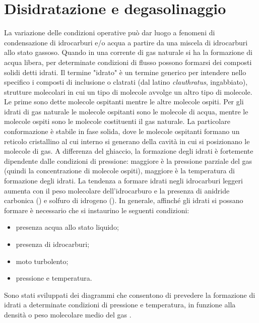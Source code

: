 \section{Disidratazione e degasolinaggio} \label{section:dehidratation}
La variazione delle condizioni operative può dar luogo a fenomeni di condensazione di idrocarburi e/o acqua a partire da una miscela di idrocarburi allo stato gassoso. Quando in una corrente di gas naturale si ha la formazione di acqua libera, per determinate condizioni di flusso possono formarsi dei composti solidi detti idrati.
Il termine "idrato" è un termine generico per intendere nello specifico i composti di inclusione o clatrati (dal latino \textit{clauthratus}, ingabbiato), strutture molecolari in cui un tipo di molecole avvolge un altro tipo di molecole. Le prime sono dette molecole ospitanti mentre le altre molecole ospiti. Per gli idrati di gas naturale le molecole ospitanti sono le molecole di acqua, mentre le molecole ospiti sono le molecole costituenti il gas naturale. La particolare conformazione è stabile in fase solida, dove le molecole ospitanti formano un reticolo cristallino al cui interno si generano della cavità in cui si posizionano le molecole di gas. 
A differenza del ghiaccio, la formazione degli idrati è fortemente dipendente dalle condizioni di pressione: maggiore è la pressione parziale del gas (quindi la concentrazione di molecole ospiti), maggiore è la temperatura di formazione degli idrati. La tendenza a formare idrati negli idrocarburi leggeri aumenta con il peso molecolare dell'idrocarburo e la presenza di anidride carbonica () e solfuro di idrogeno (). 
In generale, affinché gli idrati si possano formare è necessario che si instaurino le seguenti condizioni:
\begin{itemize}
    \item presenza acqua allo stato liquido;
    \item presenza di idrocarburi;
    \item moto turbolento;
    \item pressione e temperatura.
\end{itemize}
Sono stati sviluppati dei diagrammi che consentono di prevedere la formazione di idrati a determinate condizioni di pressione e temperatura, in funzione alla densità o peso molecolare medio del gas .
